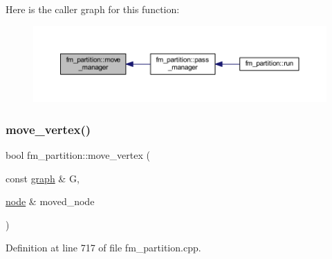Here is the caller graph for this function\+:\nopagebreak
\begin{figure}[H]
\begin{center}
\leavevmode
\includegraphics[width=350pt]{classfm__partition_a91572409b30f0967ea3782079f69b1bb_icgraph}
\end{center}
\end{figure}
\mbox{\label{classfm__partition_ac1167c6595a9f582ae98c9f555029d9b}} 
\subsubsection{\texorpdfstring{move\+\_\+vertex()}{move\_vertex()}}
{\footnotesize\ttfamily bool fm\+\_\+partition\+::move\+\_\+vertex (\begin{DoxyParamCaption}\item[{const \mbox{\hyperlink{classgraph}{graph}} \&}]{G,  }\item[{\mbox{\hyperlink{classnode}{node}} \&}]{moved\+\_\+node }\end{DoxyParamCaption})\hspace{0.3cm}{\ttfamily [protected]}}



Definition at line 717 of file fm\+\_\+partition.\+cpp.


